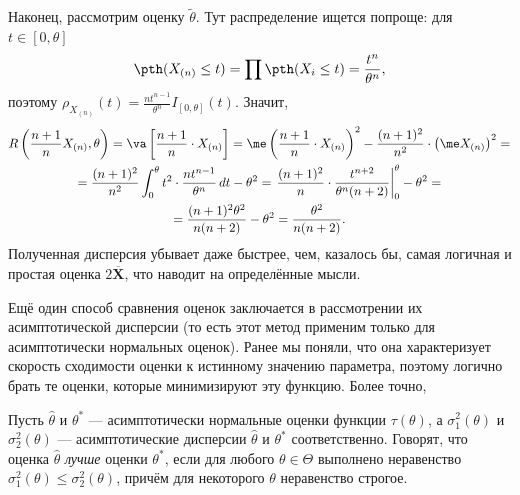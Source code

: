 \begin{example}
    Наконец, рассмотрим оценку $\widetilde{\theta}$. Тут распределение ищется попроще: для $t\in[0, \theta]$
    \[
    \pth(X_{(n)} \le t) = \prod \pth(X_{i} \le t) = \frac{t^n}{\theta^n},
    \]
    поэтому $\rho_{X_{(n)}}(t) = \frac{nt^{n-1}}{\theta^n} I_{[0, \theta]}(t)$. Значит,
    \begin{gather*}
    R\left(\frac{n+1}{n}X_{(n)}, \theta\right) = \va \left[\frac{n+1}{n}\cdot X_{(n)} \right]= \me \left(\frac{n+1}{n}\cdot X_{(n)}\right)^2 - \frac{(n+1)^2}{n^2}\cdot\left(\me X_{(n)}\right)^2 =\\
    =\frac{(n+1)^2}{n^2}\int_0^{\theta} t^2\cdot\frac{nt^{n-1}}{\theta^n}\,dt - \theta^2 = \left.\frac{(n+1)^2}{n} \cdot \frac{t^{n+2}}{\theta^n(n+2)}\right|_0^{\theta} - \theta^2=\\
    = \frac{(n+1)^2\theta^2}{n(n+2)} -\theta^2 = \frac{\theta^2}{n(n+2)}.
    \end{gather*}
    Полученная дисперсия убывает даже быстрее, чем, казалось бы, самая логичная и простая оценка $2\overline{\mathbf X}$, что наводит на определённые мысли.
\end{example}

Ещё один способ сравнения оценок заключается в рассмотрении их асимптотической дисперсии (то есть этот метод применим только для асимптотически нормальных оценок). Ранее мы поняли, что она характеризует скорость сходимости оценки к истинному значению параметра, поэтому логично брать те оценки, которые минимизируют эту функцию. Более точно,
\begin{definition}
    Пусть $\widehat{\theta}$ и $\theta^*$ --- асимптотически нормальные оценки функции $\tau(\theta)$, а $\sigma_1^2(\theta)$ и $\sigma_2^2(\theta)$ --- асимптотические дисперсии $\widehat{\theta}$ и $\theta^*$ соответственно. Говорят, что оценка $\widehat{\theta}$ \textit{лучше} оценки $\theta^*$, если для любого $\theta \in \Theta$ выполнено неравенство $\sigma_1^2(\theta) \le \sigma_2^2(\theta)$, причём для некоторого $\theta$ неравенство строгое.
\end{definition}

